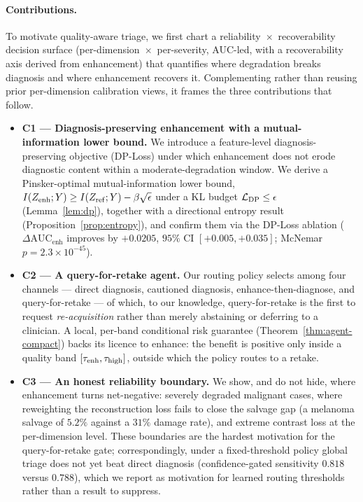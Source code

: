 \paragraph{Contributions.}
To motivate quality-aware triage, we first chart a reliability~$\times$~recoverability decision
surface (per-dimension~$\times$~per-severity, AUC-led, with a recoverability axis derived from
enhancement) that quantifies where degradation breaks diagnosis and where enhancement recovers it.
Complementing rather than reusing prior per-dimension calibration views, it frames the three
contributions that follow.
\begin{itemize}
\item \textbf{C1 --- Diagnosis-preserving enhancement with a mutual-information lower bound.} We
introduce a feature-level diagnosis-preserving objective (DP-Loss) under which enhancement does not
erode diagnostic content within a moderate-degradation window. We derive a Pinsker-optimal
mutual-information lower bound, $I(Z_{\mathrm{enh}};Y)\geq I(Z_{\mathrm{ref}};Y)-\beta\sqrt{\epsilon}$ under a KL budget
$\mathcal{L}_{\mathrm{DP}}\leq\epsilon$ (Lemma~\ref{lem:dp}), together with a directional entropy result
(Proposition~\ref{prop:entropy}), and confirm them via the DP-Loss ablation
($\Delta\mathrm{AUC}_{\text{enh}}$ improves by $+0.0205$, $95\%$ CI $[+0.005,+0.035]$; McNemar
$p=2.3\times10^{-45}$).
\item \textbf{C2 --- A query-for-retake agent.} Our routing policy selects among four channels ---
direct diagnosis, cautioned diagnosis, enhance-then-diagnose, and query-for-retake --- of which, to
our knowledge, query-for-retake is the first to request \emph{re-acquisition} rather than merely
abstaining or deferring to a clinician. A local, per-band conditional risk guarantee
(Theorem~\ref{thm:agent-compact}) backs its licence to enhance: the benefit is positive only inside a
quality band $[\tau_{\mathrm{enh}},\tau_{\mathrm{high}}]$, outside which the policy routes to a retake.
\item \textbf{C3 --- An honest reliability boundary.} We show, and do not hide, where enhancement turns
net-negative: severely degraded malignant cases, where reweighting the reconstruction loss fails to
close the salvage gap (a melanoma salvage of $5.2\%$ against a $31\%$ damage rate), and extreme
contrast loss at the per-dimension level. These boundaries are the hardest motivation for the
query-for-retake gate; correspondingly, under a fixed-threshold policy global triage does not yet beat
direct diagnosis (confidence-gated sensitivity $0.818$ versus $0.788$), which we report as motivation
for learned routing thresholds rather than a result to suppress.
\end{itemize}
